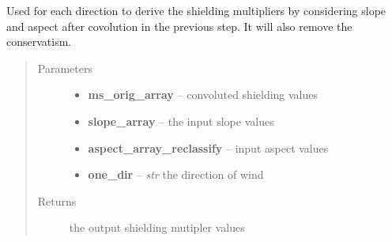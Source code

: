 \documentclass[letterpaper,10pt,english]{sphinxmanual}
\begin{document}
\begin{fulllineitems}
\label{docs/shielding:shield_mult.combine}
Used for each direction to derive the shielding multipliers by considering
slope and aspect after covolution in the previous step. It will also remove
the conservatism.
\begin{quote}\begin{description}
\item[{Parameters}] \leavevmode\begin{itemize}
\item {} 
\textbf{ms\_orig\_array} --  convoluted shielding values

\item {} 
\textbf{slope\_array} --  the input slope values

\item {} 
\textbf{aspect\_array\_reclassify} --  input aspect values

\item {} 
\textbf{one\_dir} -- \emph{str} the direction of wind

\end{itemize}

\item[{Returns}] \leavevmode
{} the output shielding mutipler values

\end{description}\end{quote}

\end{fulllineitems}


\end{document}
